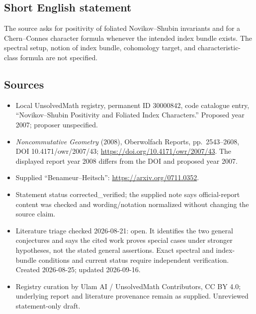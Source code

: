\documentclass[11pt]{article}
\begin{document}
\subsection{Short English statement}
The source asks for positivity of foliated Novikov--Shubin invariants and for a Chern--Connes character formula whenever the intended index bundle exists. The spectral setup, notion of index bundle, cohomology target, and characteristic-class formula are not specified.
\subsection{Sources}
\begin{itemize}
\item Local UnsolvedMath registry, permanent ID 30000842, code catalogue entry, ``Novikov--Shubin Positivity and Foliated Index Characters.'' Proposed year 2007; proposer unspecified.
\item \emph{Noncommutative Geometry} (2008), Oberwolfach Reports, pp.\ 2543--2608, DOI 10.4171/owr/2007/43; \url{https://doi.org/10.4171/owr/2007/43}. The displayed report year 2008 differs from the DOI and proposed year 2007.
\item Supplied ``Benameur--Heitsch'': \url{https://arxiv.org/0711.0352}.
\item Statement status corrected\_verified; the supplied note says official-report content was checked and wording/notation normalized without changing the source claim.
\item Literature triage checked 2026-08-21: open. It identifies the two general conjectures and says the cited work proves special cases under stronger hypotheses, not the stated general assertions. Exact spectral and index-bundle conditions and current status require independent verification. Created 2026-08-25; updated 2026-09-16.
\item Registry curation by Ulam AI / UnsolvedMath Contributors, CC BY 4.0; underlying report and literature provenance remain as supplied. Unreviewed statement-only draft.
\end{itemize}
\end{document}
